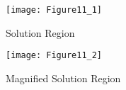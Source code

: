 \documentclass[journal,12pt,twocolumn]{IEEEtran}
\begin{document}
\begin{figure}[!ht]
\centering
\texttt{[image: Figure11\_1]}
\caption{Solution Region}
\label{fig:fig1}	
\end{figure}

\begin{figure}[!ht]
\centering
\texttt{[image: Figure11\_2]}
\caption{Magnified Solution Region}
\label{fig:fig2}	
\end{figure}
\end{document}
